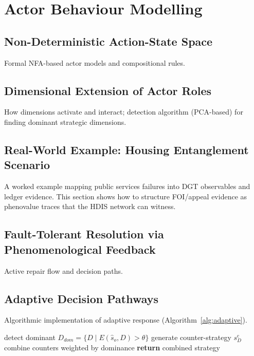 \documentclass[12pt,a4paper]{article}
\begin{document}
\section{Actor Behaviour Modelling}
\subsection{Non-Deterministic Action-State Space}
Formal NFA-based actor models and compositional rules.

\subsection{Dimensional Extension of Actor Roles}
How dimensions activate and interact; detection algorithm (PCA-based) for
finding dominant strategic dimensions.

\subsection{Real-World Example: Housing Entanglement Scenario}
A worked example mapping public services failures into DGT observables and
ledger evidence. This section shows how to structure FOI/appeal evidence as
phenovalue traces that the HDIS network can witness.

\subsection{Fault-Tolerant Resolution via Phenomenological Feedback}
Active repair flow and decision paths.

\subsection{Adaptive Decision Pathways}
Algorithmic implementation of adaptive response (Algorithm~\ref{alg:adaptive}).

\begin{algorithm}[H]
\caption{AdaptiveResponse}
\label{alg:adaptive}
\begin{algorithmic}[1]
\State detect dominant $D_{dom}=\{D\mid E(\hat{s}_o,D)>\theta\}$
  \State generate counter-strategy $s^\mathrm{c}_D$
\EndFor
\State combine counters weighted by dominance
\State \textbf{return} combined strategy
\EndProcedure
\end{algorithmic}
\end{algorithm}
\end{document}
